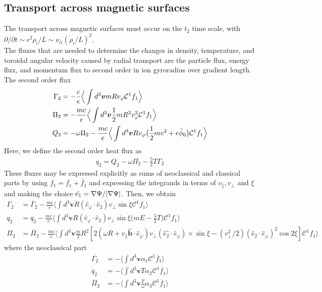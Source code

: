 \subsection{Transport across magnetic surfaces}
The transport across magnetic surfaces must occur on the $t_2$ time scale, with $\partial / \partial t \sim \epsilon^2 \rho_i / L \sim \nu_{ii}(\rho_i / L)^2$.\\
The fluxes that are needed to determine the changes in density, temperature, and toroidal angular velocity caused by radial transport are the particle flux, energy flux, and momentum flux to second order in ion gyroradius over gradient  length. \\
The second order flux
\begin{align}
    \Gamma_2 &= -\frac{c}{e}\Big\langle \int d^3\bm{v} mRv_\varphi \mathcal{C}^1 f_1 \Big\rangle \\
    \Pi_2 &= -\frac{mc}{e}\Big\langle \int d^3\bm{v}\frac{1}{2}mR^2v_\varphi^2\mathcal{C}^1f_1\Big\rangle \\
    Q_2 &= -\omega \Pi_2 -\frac{mc}{e}\Big\langle \int d^3\bm{v}Rv_\varphi \big(\frac{1}{2}mv^2+e\Tilde{\phi}_0\big)\mathcal{C}^1f_1\Big\rangle
\end{align}
Here, we define the second order heat flux as \begin{align}
    q_2 = Q_2 -\omega \Pi_2 -\frac{5}{2}T\Gamma_2
\end{align}
These fluxes may be expressed explicitly as sums of neoclassical and classical parts by using $f_1 = \overbar{f_1}+\widetilde{f_1}$ and expressing the integrands in terms of $v_\parallel, v_\perp$ and $\xi$ and making the choice $\hat{e_1}=\nabla \Psi / \abs{\nabla \Psi}$. Then, we obtain
\begin{align}
    \Gamma_2 &=\overbar{\Gamma}_2 - \frac{mc}{e}\Big \langle \int d^3\bm{v}R(\hat{e}_\varphi \cdot \hat{e}_2)v_\perp \sin{\xi} \mathcal{C}^1 f_1 \Big\rangle \\
    q_2&=\overbar{q}_2 - \frac{mc}{e}\Big\langle \int d^3\bm{v} R (\hat{e}_\varphi \cdot \hat{e}_2)v_\perp \sin{\xi}\big(mE-\frac{5}{2}T\big)\mathcal{C}^1f_1\Big\rangle \\
    \Pi_2 &= \overbar{\Pi}_2 - \frac{mc}{e}\Big\langle \int d^3\bm{v}\frac{m}{2}R^2[2(\omega R + v_\parallel \hat{\bm{b}}\cdot \hat{e}_\varphi)v_\perp(\hat{e_2}\cdot \hat{e}_\varphi) \times \sin{\xi} -(v_\perp^2/2)(\hat{e}_2\cdot \hat{e}_\varphi)^2 \cos{2\xi}]\mathcal{C}^1f_1\Big\rangle
\end{align}
where the neoclassical part 
\begin{align}
    \overbar{\Gamma_2} &= -\Big\langle \int d^3\bm{v} \alpha_1 \mathcal{C}^1 \overbar{f}_1 \Big\rangle \\
    \overbar{q}_2 &= -\Big\langle \int d^3\bm{v}T\alpha_2 \mathcal{C}^1 \overbar{f}_1 \Big\rangle \\
    \overbar{\Pi}_2 &= -\Big\langle \int d^3\bm{v} \frac{T}{\omega}\alpha_3 \mathcal{C}^1 \overbar{f}_1 \Big\rangle
\end{align}
